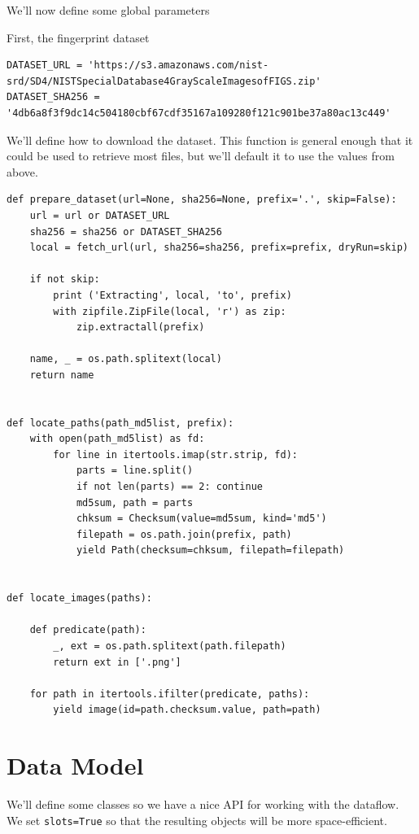 We'll now define some global parameters

First, the fingerprint dataset

\begin{lstlisting}
DATASET_URL = 'https://s3.amazonaws.com/nist-srd/SD4/NISTSpecialDatabase4GrayScaleImagesofFIGS.zip'
DATASET_SHA256 = '4db6a8f3f9dc14c504180cbf67cdf35167a109280f121c901be37a80ac13c449'
\end{lstlisting}

We'll define how to download the dataset. This function is general
enough that it could be used to retrieve most files, but we'll default
it to use the values from above.

\begin{lstlisting}
def prepare_dataset(url=None, sha256=None, prefix='.', skip=False):
    url = url or DATASET_URL
    sha256 = sha256 or DATASET_SHA256
    local = fetch_url(url, sha256=sha256, prefix=prefix, dryRun=skip)

    if not skip:
        print ('Extracting', local, 'to', prefix)
        with zipfile.ZipFile(local, 'r') as zip:
            zip.extractall(prefix)

    name, _ = os.path.splitext(local)
    return name


def locate_paths(path_md5list, prefix):
    with open(path_md5list) as fd:
        for line in itertools.imap(str.strip, fd):
            parts = line.split()
            if not len(parts) == 2: continue
            md5sum, path = parts
            chksum = Checksum(value=md5sum, kind='md5')
            filepath = os.path.join(prefix, path)
            yield Path(checksum=chksum, filepath=filepath)


def locate_images(paths):

    def predicate(path):
        _, ext = os.path.splitext(path.filepath)
        return ext in ['.png']

    for path in itertools.ifilter(predicate, paths):
        yield image(id=path.checksum.value, path=path)
\end{lstlisting}

\section{Data Model}\label{data-model}

We'll define some classes so we have a nice API for working with the
dataflow. We set \texttt{slots=True} so that the resulting objects will
be more space-efficient.


